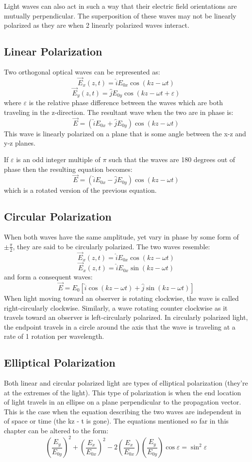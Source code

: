 \documentclass[12pt]{report}
\begin{document}
Light waves can also act in such a way that their electric field orientations are mutually perpendicular. The superposition of these waves may not be linearly polarized as they are when 2 linearly polarized waves interact. 

\subsection{Linear Polarization}
Two orthogonal optical waves can be represented as:
\[\vec{E}_x(z,t)=\hat{i}E_{0x} \cos (kz-\omega t)\]
\[\vec{E}_y(z,t)=\hat{j}E_{0y} \cos (kz-\omega t+\varepsilon)\]
where $\varepsilon$ is the relative phase difference between the waves which are both traveling in the z-direction. The resultant wave when the two are in phase is:
\[\vec{E}=(\hat{i}E_{0x}+\hat{j}E_{0y}) \cos (kz-\omega t)\]
This wave is linearly polarized on a plane that is some angle between the x-z and y-z planes. 

If $\varepsilon$ is an odd integer multiple of $\pi$ such that the waves are 180 degrees out of phase then the resulting equation becomes:
\[\vec{E}=(\hat{i}E_{0x}-\hat{j}E_{0y}) \cos (kz-\omega t)\] which is a rotated version of the previous equation. 

\subsection{Circular Polarization}
When both waves have the same amplitude, yet vary in phase by some form of $\pm \frac{\pi}{2}$, they are said to be circularly polarized. The two waves resemble:
\[\vec{E}_x(z,t)=\hat{i}E_{0x} \cos (kz-\omega t)\]
\[\vec{E}_x(z,t)=\hat{i}E_{0x} \sin (kz-\omega t)\]
and form a consequent waves:
\[\vec{E} = E_0 \left[\hat{i} \cos (kz-\omega t) +\hat{j}\sin (kz-\omega t) \right]\]
When light moving toward an observer is rotating clockwise, the wave is called right-circularly clockwise. Similarly, a wave rotating counter clockwise as it travels toward an observer is left-circularly polarized. In circularly polarized light, the endpoint travels in a circle around the axis that the wave is traveling at a rate of 1 rotation per wavelength. 
\subsection{Elliptical Polarization}
Both linear and circular polarized light are types of elliptical polarization (they're at the extremes of the light). This type of polarization is when the end location of light travels in an ellipse on a plane perpendicular to the propagation vector. This is the case when the equation describing the two waves are independent in of space or time (the kz - \textomega t is gone). The equations mentioned so far in this chapter can be altered to the form:
\begin{equation}
\left( \frac{E_y}{E_{0y}} \right) ^2 + \left( \frac{E_x}{E_{0x}} \right) ^2 -2 \left( \frac{E_x}{E_{0x}} \right) \left( \frac{E_y}{E_{0y}} \right) \cos \varepsilon = \sin ^2 \varepsilon
\end{equation}
\end{document}
